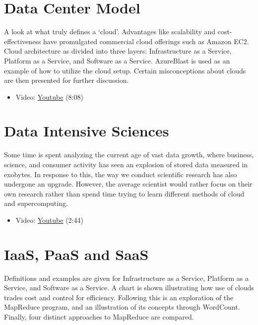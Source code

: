 \section{Data Center Model}\label{data-center-model}

A look at what truly defines a `cloud'. Advantages like scalability and
cost-effectiveness have promulgated commercial cloud offerings such as
Amazon EC2. Cloud architecture as divided into three layers:
Infrastructure as a Service, Platform as a Service, and Software as a
Service. AzureBlast is used as an example of how to utilize the cloud
setup. Certain misconceptions about clouds are then presented for
further discussion.

\begin{itemize}
\tightlist
\item
  Video: \href{https://www.youtube.com/watch?v=6Hq_LuLB-RU}{Youtube}
  (8:08)
\end{itemize}

\section{Data Intensive Sciences}\label{data-intensive-sciences}

Some time is spent analyzing the current age of vast data growth, where
business, science, and consumer activity has seen an explosion of stored
data measured in exobytes. In response to this, the way we conduct
scientific research has also undergone an upgrade. However, the average
scientist would rather focus on their own research rather than spend
time trying to learn different methods of cloud and supercomputing.

\begin{itemize}
\tightlist
\item
  Video: \href{https://www.youtube.com/watch?v=Ptoj3BME_z4}{Youtube}
  (2:44)
\end{itemize}

\section{IaaS, PaaS and SaaS}\label{iaas-paas-and-saas}

Definitions and examples are given for Infrastructure as a Service,
Platform as a Service, and Software as a Service. A chart is shown
illustrating how use of clouds trades cost and control for efficiency.
Following this is an exploration of the MapReduce program, and an
illustration of its concepts through WordCount. Finally, four distinct
approaches to MapReduce are compared.

